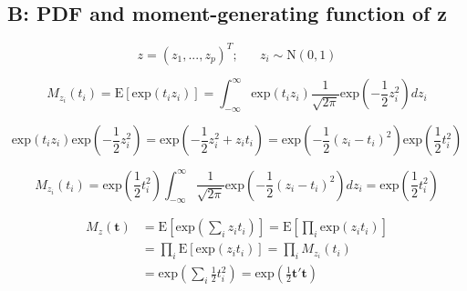 \documentclass[12pt]{article}
\begin{document}
    \subsection*{B: PDF and moment-generating function of z}

        \begin{equation}
            z = (z_1,...,z_p)^T; \hspace{20pt} z_i \sim \text{N}(0,1)
        \end{equation}

        \begin{equation}
            M_{z_i}(t_i) = \text{E}[\text{exp}(t_i z_i)] = \int_{-\infty}^\infty \text{exp}(t_i z_i) \frac{1}{\sqrt{2 \pi}} \text{exp}\left( -\frac{1}{2} z_i^2 \right) dz_i
        \end{equation}

        \begin{equation}
            \text{exp}(t_i z_i) \text{exp}\left( -\frac{1}{2} z_i^2 \right) = \text{exp}\left( -\frac{1}{2} z_i^2 + z_i t_i\right) = \text{exp}\left( -\frac{1}{2}(z_i - t_i)^2 \right) \text{exp} \left (\frac{1}{2} t_i^2 \right)
        \end{equation}

        \begin{equation}
            M_{z_i}(t_i) = \text{exp}\left( \frac{1}{2} t_i^2\right) \int_{-\infty}^{\infty} \frac{1}{\sqrt{2\pi}} \text{exp}\left( - \frac{1}{2} (z_i - t_i)^2\right) dz_i = \text{exp}\left( \frac{1}{2}t_i^2 \right )
        \end{equation}

        \begin{align}
            M_z(\mathbf{t}) &= \text{E}\left[\text{exp}\left(\sum_i z_i t_i\right)\right] = \text{E}\left[ \prod_i \text{exp}(z_i t_i)\right]\\
            &= \prod_i \text{E}[\text{exp}(z_i t_i)] = \prod_i M_{z_i}(t_i)\\
            &= \text{exp}\left( \sum_i \frac{1}{2} t_i^2 \right) = \text{exp}\left ( \frac{1}{2} \mathbf{t't}\right)
        \end{align}
\end{document}
